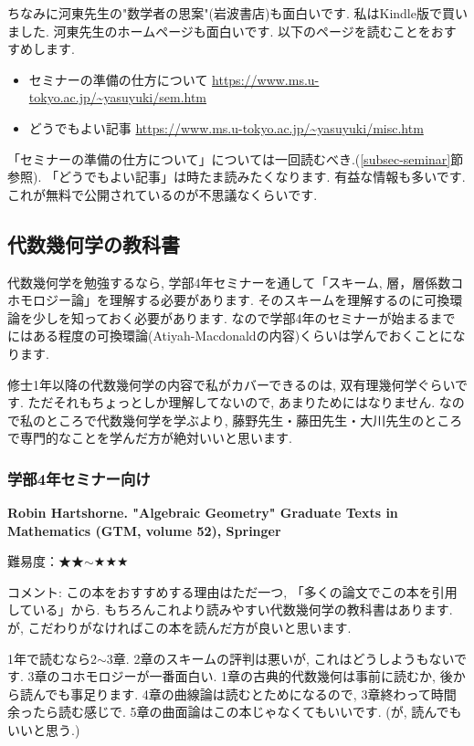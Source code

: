 ちなみに河東先生の"数学者の思案"(岩波書店)も面白いです. 私はKindle版で買いました.
河東先生のホームページも面白いです. 以下のページを読むことをおすすめします. 
\begin{itemize}[left=0pt]
  \setlength{\parskip}{0cm} %
  \setlength{\itemsep}{0cm} %
\item セミナーの準備の仕方について \url{https://www.ms.u-tokyo.ac.jp/~yasuyuki/sem.htm}
\item どうでもよい記事 \url{https://www.ms.u-tokyo.ac.jp/~yasuyuki/misc.htm}
\end{itemize}
「セミナーの準備の仕方について」については一回読むべき.(\ref{subsec-seminar}節参照).  
「どうでもよい記事」は時たま読みたくなります. 有益な情報も多いです. これが無料で公開されているのが不思議なくらいです. 

\subsection{代数幾何学の教科書}

代数幾何学を勉強するなら, 学部4年セミナーを通して「スキーム, 層，層係数コホモロジー論」を理解する必要があります. そのスキームを理解するのに可換環論を少しを知っておく必要があります. 
なので学部4年のセミナーが始まるまでにはある程度の可換環論(Atiyah-Macdonaldの内容)くらいは学んでおくことになります. 

修士1年以降の代数幾何学の内容で私がカバーできるのは, 双有理幾何学ぐらいです.
ただそれもちょっとしか理解してないので, あまりためにはなりません. 
なので私のところで代数幾何学を学ぶより, 藤野先生・藤田先生・大川先生のところで専門的なことを学んだ方が絶対いいと思います. 

\subsubsection{学部4年セミナー向け}

\textbf{Robin Hartshorne. "Algebraic Geometry" Graduate Texts in Mathematics (GTM, volume 52), Springer} \vspace{-6pt}

難易度：★★$\sim$★★★  \vspace{-6pt}

コメント: この本をおすすめする理由はただ一つ, 「多くの論文でこの本を引用している」から.  もちろんこれより読みやすい代数幾何学の教科書はあります. が, こだわりがなければこの本を読んだ方が良いと思います. 

1年で読むなら2$\sim$3章. 2章のスキームの評判は悪いが, これはどうしようもないです. 3章のコホモロジーが一番面白い. 
1章の古典的代数幾何は事前に読むか, 後から読んでも事足ります. 
4章の曲線論は読むとためになるので, 3章終わって時間余ったら読む感じで. 
5章の曲面論はこの本じゃなくてもいいです. (が, 読んでもいいと思う.)
\vspace{8pt}


